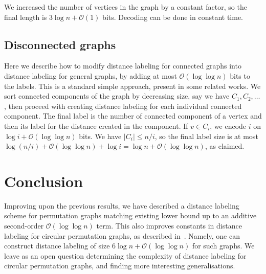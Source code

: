 \documentclass[a4paper,11pt]{article}
\newcommand{\Oh}{\mathcal{O}}
\begin{document}
We increased the number of vertices in the graph by a constant factor, so the final length is $3\log{n}+\Oh(1)$ bits.
Decoding can be done in constant time.

\subsection{Disconnected graphs}
Here we describe how to modify distance labeling for connected graphs into distance labeling for general graphs,
by adding at most $\Oh(\log{\log{n}})$ bits to the labels.
This is a standard simple approach, present in some related works.
We sort connected components of the graph by decreasing size, say we have $C_1,C_2,\ldots$,
then proceed with creating distance labeling for each individual connected component.
The final label is the number of connected component of a vertex and then its label for the distance created in the component.
If $v \in C_i$, we encode $i$ on $\log{i}+\Oh(\log{\log{n}})$ bits.
We have $|C_i| \leq n/i$, so the final label size is at most $\log{(n/i)}+\Oh(\log{\log{n}})+\log{i}=\log{n}+\Oh(\log{\log{n}})$, as claimed.



\section{Conclusion}
Improving upon the previous results, we have described a distance labeling scheme for permutation graphs matching existing
lower bound up to an additive second-order $\Oh(\log{\log{n}})$ term.
This also improves constants in distance labeling for circular permutation graphs, as described in~\cite{BazzaroG05}.
Namely, one can construct distance labeling of size $6\log{n}+\Oh(\log{\log{n}})$ for such graphs.
We leave as an open question determining the complexity of distance labeling for circular permutation graphs,
and finding more interesting generalisations.






\end{document}
